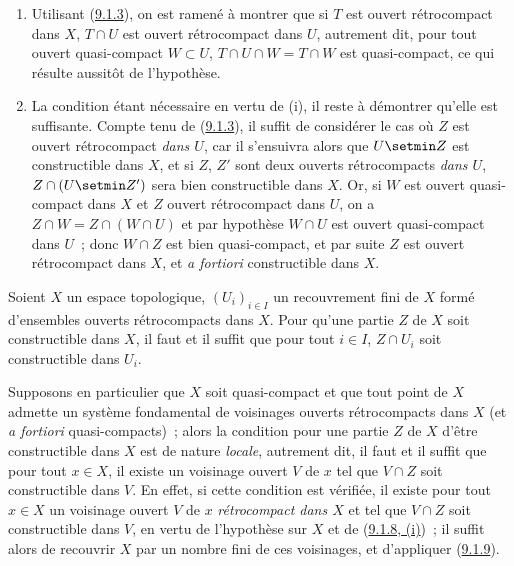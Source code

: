 \begin{enumerate}
  \item[(i)] Utilisant (\hyperref[0.9.1.3-fr]{9.1.3}), on est ramené à
    montrer que si $T$ est ouvert rétrocompact dans $X$, $T\cap U$ est ouvert
    rétrocompact dans $U$, autrement dit, pour tout ouvert quasi-compact
    $W\subset U$, $T\cap U\cap W=T\cap W$ est quasi-compact, ce qui résulte
    aussitôt de l'hypothèse.
  \item[(ii)] La condition étant nécessaire en vertu de (i), il reste à
    démontrer qu'elle est suffisante. Compte tenu de
    (\hyperref[0.9.1.3-fr]{9.1.3}), il suffit de considérer le cas où $Z$ est
    ouvert rétrocompact \emph{dans $U$}, car il s'ensuivra alors que
    $U\setmin Z$ est constructible dans $X$, et si $Z$, $Z'$ sont deux
    ouverts rétrocompacts \emph{dans $U$},
    $Z\cap(U\setmin Z')$ sera bien constructible dans $X$. Or, si $W$ est
    ouvert quasi-compact dans $X$ et $Z$ ouvert rétrocompact dans $U$, on a
    $Z\cap W=Z\cap(W\cap U)$ et par hypothèse $W\cap U$ est ouvert
    quasi-compact dans $U$~; donc $W\cap Z$ est bien quasi-compact, et par
    suite $Z$ est ouvert rétrocompact dans $X$, et \emph{a fortiori}
    constructible dans $X$.
\end{enumerate}

\begin{corollary}[9.1.9]
\label{0.9.1.9-fr}
Soient $X$ un espace topologique, $(U_i)_{i\in I}$ un recouvrement fini de
$X$ formé d'ensembles ouverts rétrocompacts dans $X$. Pour qu'une partie $Z$
de $X$ soit constructible dans $X$, il faut et il suffit que pour tout
$i\in I$, $Z\cap U_i$ soit constructible dans $U_i$.
\end{corollary}

\begin{env}[9.1.10]
\label{0.9.1.10-fr}
Supposons en particulier que $X$ soit quasi-compact et que tout point
de $X$ admette un système fondamental de voisinages ouverts rétrocompacts
dans $X$ (et \emph{a fortiori} quasi-compacts)~; alors la condition pour une
partie $Z$ de $X$ d'être constructible dans $X$ est de nature \emph{locale},
autrement dit, il faut et il suffit que pour tout $x\in X$, il existe un
voisinage ouvert $V$ de $x$ tel que $V\cap Z$ soit constructible dans $V$. En
effet, si cette condition est vérifiée, il existe pour tout $x\in X$ un
voisinage ouvert $V$ de $x$ \emph{rétrocompact dans $X$} et tel que
$V\cap Z$ soit constructible dans $V$, en vertu de l'hypothèse sur $X$ et de
(\hyperref[0.9.1.8-fr]{9.1.8, (i)})~; il suffit alors de recouvrir $X$ par un
nombre fini de ces voisinages, et d'appliquer
(\hyperref[0.9.1.9-fr]{9.1.9}).
\end{env}

